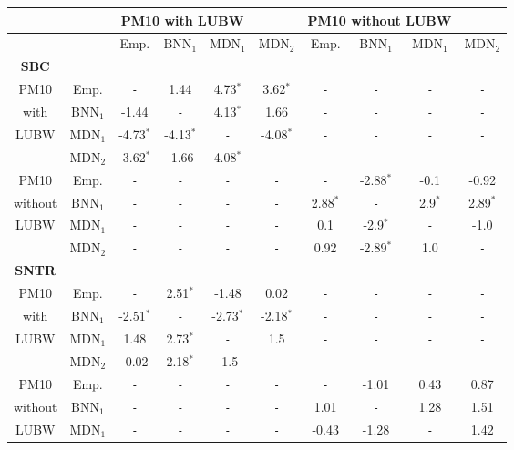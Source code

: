 \begin{tabular}{c|c|cccc||cccc} 
  \hline 
  \hline 
  &&\multicolumn{3}{c}{PM10 with LUBW} && \multicolumn{3}{c}{PM10 without LUBW} \\ 
  \hline 
  &&Emp.&BNN$_1$&MDN$_1$&MDN$_2$&Emp.&BNN$_1$&MDN$_1$&MDN$_2$ \\ 
  \hline 
  \hline 
  \textbf{SBC}&&&&&&& \\ 
  PM10&Emp.&\texttt{\--}&1.44&4.73$^*$&3.62$^*$&\texttt{\--}&\texttt{\--}&\texttt{\--}&\texttt{\--} \\ 
  with&BNN$_1$&-1.44&\texttt{\--}&4.13$^*$&1.66&\texttt{\--}&\texttt{\--}&\texttt{\--}&\texttt{\--} \\ 
  LUBW&MDN$_1$&-4.73$^*$&-4.13$^*$&\texttt{\--}&-4.08$^*$&\texttt{\--}&\texttt{\--}&\texttt{\--}&\texttt{\--} \\ 
  &MDN$_2$&-3.62$^*$&-1.66&4.08$^*$&\texttt{\--}&\texttt{\--}&\texttt{\--}&\texttt{\--}&\texttt{\--} \\ 
  \hline     
  PM10&Emp.&\texttt{\--}&\texttt{\--}&\texttt{\--}&\texttt{\--}&\texttt{\--}&-2.88$^*$&-0.1&-0.92 \\ 
  without&BNN$_1$&\texttt{\--}&\texttt{\--}&\texttt{\--}&\texttt{\--}&2.88$^*$&\texttt{\--}&2.9$^*$&2.89$^*$ \\ 
  LUBW&MDN$_1$&\texttt{\--}&\texttt{\--}&\texttt{\--}&\texttt{\--}&0.1&-2.9$^*$&\texttt{\--}&-1.0 \\ 
  &MDN$_2$&\texttt{\--}&\texttt{\--}&\texttt{\--}&\texttt{\--}&0.92&-2.89$^*$&1.0&\texttt{\--} \\ 
  \hline     
  \hline     
  \textbf{SNTR}&&&&&&& \\ 
  PM10&Emp.&\texttt{\--}&2.51$^*$&-1.48&0.02&\texttt{\--}&\texttt{\--}&\texttt{\--}&\texttt{\--} \\ 
  with&BNN$_1$&-2.51$^*$&\texttt{\--}&-2.73$^*$&-2.18$^*$&\texttt{\--}&\texttt{\--}&\texttt{\--}&\texttt{\--} \\ 
  LUBW&MDN$_1$&1.48&2.73$^*$&\texttt{\--}&1.5&\texttt{\--}&\texttt{\--}&\texttt{\--}&\texttt{\--} \\ 
  &MDN$_2$&-0.02&2.18$^*$&-1.5&\texttt{\--}&\texttt{\--}&\texttt{\--}&\texttt{\--}&\texttt{\--} \\ 
  \hline     
  PM10&Emp.&\texttt{\--}&\texttt{\--}&\texttt{\--}&\texttt{\--}&\texttt{\--}&-1.01&0.43&0.87 \\ 
  without&BNN$_1$&\texttt{\--}&\texttt{\--}&\texttt{\--}&\texttt{\--}&1.01&\texttt{\--}&1.28&1.51 \\ 
  LUBW&MDN$_1$&\texttt{\--}&\texttt{\--}&\texttt{\--}&\texttt{\--}&-0.43&-1.28&\texttt{\--}&1.42 \\ 

\end{tabular}
